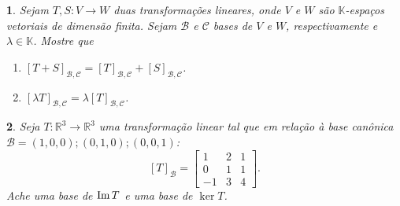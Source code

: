 \documentclass[12pt]{exam}
\newtheorem{exercicio}{}
\newcommand{\im}{{\rm Im\,}}
\newcommand{\real}{\mathbb{R}}
\newcommand{\cp}[1]{\mathbb{#1}}
\begin{document}
\begin{exercicio}
  Sejam $T, S : V \to W$ duas transforma\c{c}\~oes lineares, onde $V$ e $W$ s\~ao $\cp{K}$-espa\c{c}os vetoriais de dimens\~ao finita. Sejam $\mathcal{B}$ e $\mathcal{C}$ bases de $V$ e $W$, respectivamente e $\lambda \in \cp{K}$. Mostre que
  \begin{enumerate}[label=({\alph*})]
    \item $[T + S]_{\mathcal{B}, \mathcal{C}} = [T]_{\mathcal{B}, \mathcal{C}} + [S]_{\mathcal{B}, \mathcal{C}}$.
    \item $[\lambda T]_{\mathcal{B}, \mathcal{C}} = \lambda [T]_{\mathcal{B}, \mathcal{C}}$.
  \end{enumerate}
\end{exercicio}

\begin{exercicio}
  Seja $T : \real^3 \to \real^3$ uma transforma\c{c}\~ao linear tal que em rela\c{c}\~ao \`a base can\^onica $\mathcal{B} = {(1,0,0); (0,1,0); (0,0,1)}$:
  \[
    [T]_\mathcal{B} =\begin{bmatrix}
      1 & 2 & 1\\
      0 & 1 & 1\\
      -1 & 3 & 4
    \end{bmatrix}.
  \]
  Ache uma base de $\im T$ e uma base de $\ker T$.
\end{exercicio}
\end{document}
